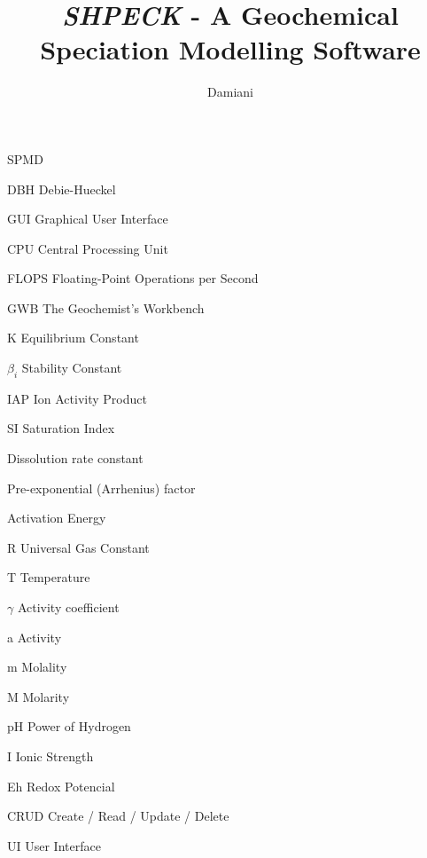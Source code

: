 \documentclass[ppgc,mestrado,english]{iiufrgs}
\title{\emph{SHPECK} - A Geochemical Speciation Modelling Software}
\author{Damiani}{Leonardo Hax}
\begin{document}
	
\renewcommand{\lstlistingname}{Code}

\maketitle

\clearpage
\begin{flushright}
\mbox{}\vfill
\end{flushright}

\renewcommand*\contentsname{Summary}
\tableofcontents



\begin{listofabbrv}{SPMD}
        \item[DBH] Debie-Hueckel 
        \item[GUI] Graphical User Interface
        \item[CPU] Central Processing Unit
        \item[FLOPS] Floating-Point Operations per Second
        \item[GWB] The Geochemist's Workbench
        \item[K] Equilibrium Constant
        \item[$\beta_i$] Stability Constant 
        \item[IAP] Ion Activity Product 
        \item[SI] Saturation Index 
        \item[\ce{k_{diss}}] Dissolution rate constant
        \item[\ce{k_0}] Pre-exponential (Arrhenius) factor
        \item[\ce{E_a}] Activation Energy
        \item[R] Universal Gas Constant
        \item[T] Temperature
        \item[$\gamma$] Activity coefficient
        \item[a] Activity
        \item[m] Molality
        \item[M] Molarity
        \item[pH] Power of Hydrogen
        \item[I] Ionic Strength
        \item[Eh] Redox Potencial
        \item[CRUD] Create / Read / Update / Delete
        \item[UI] User Interface
\end{listofabbrv}
\end{document}

